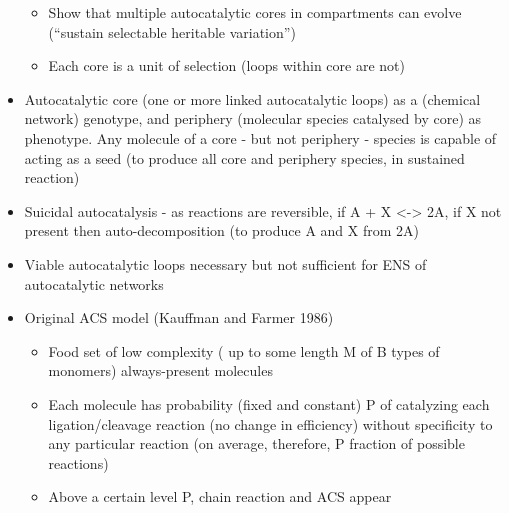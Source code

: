 \begin{itemize}
\begin{itemize}
				\item
				
				Show that multiple autocatalytic cores in compartments can evolve
				(``sustain selectable heritable variation'')
				
				\item
				
				Each core is a unit of selection (loops within core are not)
				
			\end{itemize}
			\item
			
			Autocatalytic core (one or more linked autocatalytic loops) as a
			(chemical network) genotype, and periphery (molecular species
			catalysed by core) as phenotype. Any molecule of a core - but not
			periphery - species is capable of acting as a seed (to produce all
			core and periphery species, in sustained reaction)
			
			\item
			
			Suicidal autocatalysis - as reactions are reversible, if A + X
			\textless{}-\textgreater{} 2A, if X not present then
			auto-decomposition (to produce A and X from 2A)
			
			\item
			
			Viable autocatalytic loops necessary but not sufficient for ENS of
			autocatalytic networks
			
			\item
			
			Original ACS model (Kauffman and Farmer 1986)
			
			
			\begin{itemize}
				\item
				
				Food set of low complexity ( up to some length M of B types of
				monomers) always-present molecules
				
				\item
				
				Each molecule has probability (fixed and constant) P of catalyzing
				each ligation/cleavage reaction (no change in efficiency) without
				specificity to any particular reaction (on average, therefore, P
				fraction of possible reactions)
				
				\item
				
				Above a certain level P, chain reaction and ACS appear
				

\end{itemize}
\end{itemize}

